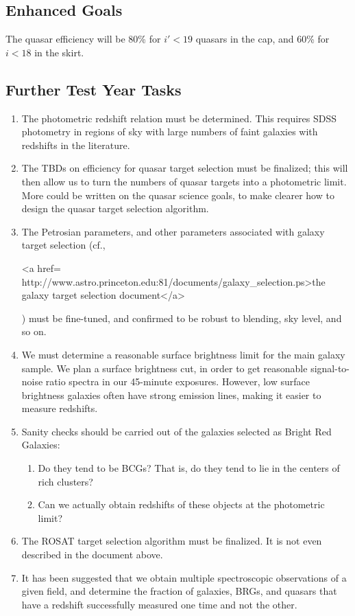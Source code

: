 \subsection{Enhanced Goals}
  The quasar efficiency will be 80\% for
$i'<19$ quasars in the cap, and 60\% for $i<18$ in the skirt.

\subsection{Further Test Year Tasks}
\begin{enumerate} 
\item The photometric redshift relation must be determined.  This
requires SDSS photometry in regions of sky with large numbers of faint
galaxies with redshifts in the literature.
\item The TBDs on efficiency for quasar target selection must be
finalized; this will then allow us to turn the numbers of quasar
targets into a photometric limit.  More could be written on the quasar
science goals, to make clearer how to design the quasar target
selection algorithm. 
\item The Petrosian parameters, and other parameters associated with
galaxy target selection (cf., 
\begin{rawhtml}
<a href=
http://www.astro.princeton.edu:81/documents/galaxy_selection.ps>the galaxy target
selection document</a>\end{rawhtml}) must
be fine-tuned, and confirmed to be robust to blending, sky level, and
so on. 
\item We must determine a reasonable surface brightness limit for the
main galaxy sample.  We plan a surface brightness cut, in order to get
reasonable signal-to-noise ratio spectra in our 45-minute exposures.
However, low surface brightness galaxies often have strong emission
lines, making it easier to measure redshifts.  
\item Sanity checks should be carried out of the galaxies selected as
Bright Red Galaxies:
\begin{enumerate} 
\item Do they tend to be BCGs?  That is, do they tend to lie in the
centers of rich clusters?
\item Can we actually obtain redshifts of these objects at the
photometric limit?
\end{enumerate}

\item The ROSAT target selection algorithm must be finalized.  It is
not even described in the document above. 

\item It has been suggested that we obtain multiple spectroscopic
observations of a given field, and determine the fraction of galaxies,
BRGs, and quasars that have a redshift successfully measured one time
and not the other. 

\end{enumerate}

